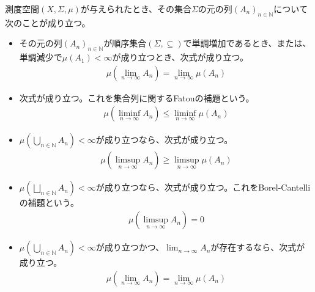 \documentclass[dvipdfmx]{jsarticle}
\begin{document}
\begin{thm}\label{4.5.3.14}
測度空間$(X,\varSigma,\mu)$が与えられたとき、その集合$\varSigma$の元の列$\left( A_{n} \right)_{n \in \mathbb{N}}$について次のことが成り立つ。
\begin{itemize}
\item
  その元の列$\left( A_{n} \right)_{n \in \mathbb{N}}$が順序集合$(\varSigma, \subseteq )$で単調増加であるとき、または、単調減少で$\mu\left( A_{1} \right) < \infty$が成り立つとき、次式が成り立つ。
\begin{align*}
\mu\left( \lim_{n \rightarrow \infty}A_{n} \right) = \lim_{n \rightarrow \infty}{\mu\left( A_{n} \right)}
\end{align*}
\item
  次式が成り立つ。これを集合列に関するFatouの補題という。
\begin{align*}
\mu\left( \liminf_{n \rightarrow \infty}A_{n} \right) \leq \liminf_{n \rightarrow \infty}{\mu\left( A_{n} \right)}
\end{align*}
\item
  $\mu\left( \bigcup_{n \in \mathbb{N}} A_{n} \right) < \infty$が成り立つなら、次式が成り立つ。
\begin{align*}
\mu\left( \limsup_{n \rightarrow \infty}A_{n} \right) \geq \limsup_{n \rightarrow \infty}{\mu\left( A_{n} \right)}
\end{align*}
\item
  $\mu\left( \bigsqcup_{n \in \mathbb{N}} A_{n} \right) < \infty$が成り立つなら、次式が成り立つ。これをBorel-Cantelliの補題という。
\begin{align*}
\mu\left( \limsup_{n \rightarrow \infty}A_{n} \right) = 0
\end{align*}
\item
  $\mu\left( \bigcup_{n \in \mathbb{N}} A_{n} \right) < \infty$が成り立つかつ、$\lim_{n \rightarrow \infty}A_{n}$が存在するなら、次式が成り立つ。
\begin{align*}
\mu\left( \lim_{n \rightarrow \infty}A_{n} \right) = \lim_{n \rightarrow \infty}{\mu\left( A_{n} \right)}
\end{align*}
\end{itemize}
\end{thm}
\end{document}
